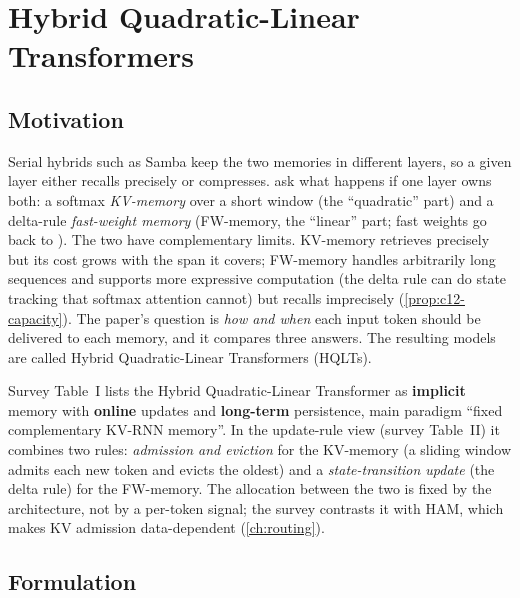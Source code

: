 \section{Hybrid Quadratic-Linear Transformers}\label{sec:c12-hqlt}

\subsection{Motivation}

Serial hybrids such as Samba keep the two memories in different layers, so a given layer either
recalls precisely or compresses. \citet{irie2025blending} ask what happens if one layer owns
both: a softmax \emph{KV-memory} over a short window (the ``quadratic'' part) and a
delta-rule \emph{fast-weight memory} (FW-memory, the ``linear'' part; fast weights go back to
\citealp{schmidhuber1992fastweights}). The two have complementary limits. KV-memory retrieves
precisely but its cost grows with the span it covers; FW-memory handles arbitrarily long
sequences and supports more expressive computation (the delta rule can do state tracking that
softmax attention cannot) but recalls imprecisely (\cref{prop:c12-capacity}). The paper's
question is \emph{how and when} each input token should be delivered to each memory, and it
compares three answers. The resulting models are called Hybrid Quadratic-Linear Transformers
(HQLTs).

\begin{taxonomy}
Survey Table~I \citep{zhoubian2026memory} lists the Hybrid Quadratic-Linear Transformer as
\textbf{implicit} memory with \textbf{online} updates and \textbf{long-term} persistence, main
paradigm ``fixed complementary KV-RNN memory''. In the update-rule view (survey Table~II) it
combines two rules: \emph{admission and eviction} for the KV-memory (a sliding window admits
each new token and evicts the oldest) and a \emph{state-transition update} (the delta rule) for
the FW-memory. The allocation between the two is fixed by the architecture, not by a
per-token signal; the survey contrasts it with HAM, which makes KV admission data-dependent
(\cref{ch:routing}).
\end{taxonomy}

\subsection{Formulation}\label{sec:c12-hqlt-form}

